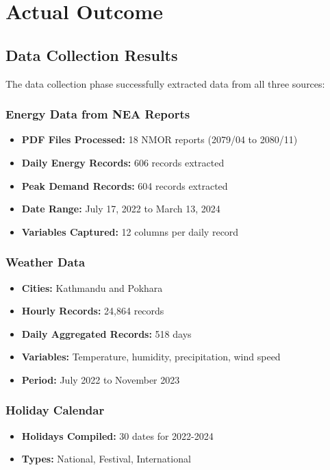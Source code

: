 \chapter{Actual Outcome}
        \section{Data Collection Results}
        The data collection phase successfully extracted data from all three sources:

        \subsection{Energy Data from NEA Reports}
        \begin{itemize}
            \item \textbf{PDF Files Processed:} 18 NMOR reports (2079/04 to 2080/11)
            \item \textbf{Daily Energy Records:} 606 records extracted
            \item \textbf{Peak Demand Records:} 604 records extracted
            \item \textbf{Date Range:} July 17, 2022 to March 13, 2024
            \item \textbf{Variables Captured:} 12 columns per daily record
        \end{itemize}

        \subsection{Weather Data}
        \begin{itemize}
            \item \textbf{Cities:} Kathmandu and Pokhara
            \item \textbf{Hourly Records:} 24,864 records
            \item \textbf{Daily Aggregated Records:} 518 days
            \item \textbf{Variables:} Temperature, humidity, precipitation, wind speed
            \item \textbf{Period:} July 2022 to November 2023
        \end{itemize}

        \subsection{Holiday Calendar}
        \begin{itemize}
            \item \textbf{Holidays Compiled:} 30 dates for 2022-2024
            \item \textbf{Types:} National, Festival, International
        \end{itemize}

